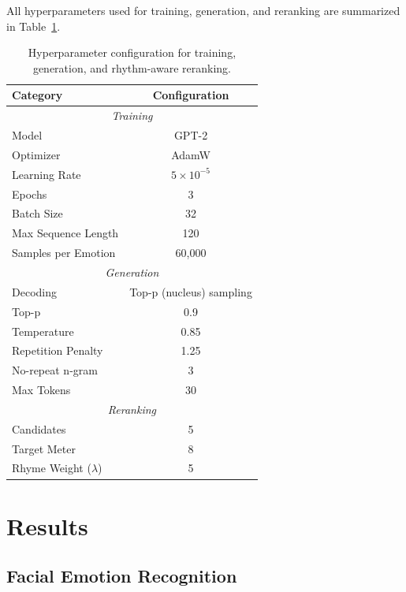 \documentclass[11pt]{article}
\begin{document}
All hyperparameters used for training, generation, and reranking are summarized in Table~\ref{language_parameters}.

\begin{table}[h]
\centering
\small
\begin{tabular*}{\linewidth}{@{\extracolsep{\fill}}l c}
\hline
\textbf{Category} & \textbf{Configuration} \\
\hline
\multicolumn{2}{c}{\textit{Training}} \\
\hline
Model & GPT-2 \\
Optimizer & AdamW \\
Learning Rate & $5 \times 10^{-5}$ \\
Epochs & 3 \\
Batch Size & 32 \\
Max Sequence Length & 120 \\
Samples per Emotion & 60,000 \\
\hline
\multicolumn{2}{c}{\textit{Generation}} \\
\hline
Decoding & Top-p (nucleus) sampling \\
Top-p & 0.9 \\
Temperature & 0.85 \\
Repetition Penalty & 1.25 \\
No-repeat n-gram & 3 \\
Max Tokens & 30 \\
\hline
\multicolumn{2}{c}{\textit{Reranking}} \\
\hline
Candidates & 5 \\
Target Meter & 8  \\
Rhyme Weight ($\lambda$) & 5 \\
\hline
\end{tabular*}
\caption{Hyperparameter configuration for training, generation, and rhythm-aware reranking.}
\label{language_parameters}
\end{table}


\section{Results}

\subsection{Facial Emotion Recognition}
\end{document}
